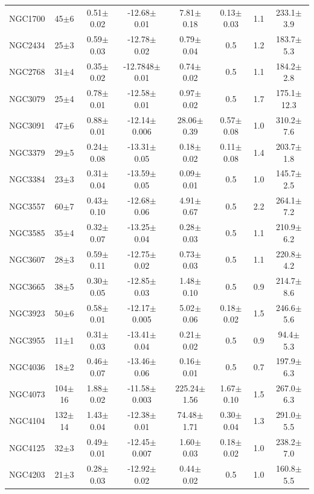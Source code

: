 \documentclass[iop]{emulateapj}
\begin{document}
\begin{table}
\begin{tabular}{lccccccc}
NGC1700 & 45$\pm$6 & 0.51$\pm$0.02 & -12.68$\pm$0.01  & 7.81$\pm$0.18  & 0.13$\pm$0.03 & 1.1  & 233.1$\pm$3.9\\
NGC2434 & 25$\pm$3 & 0.59$\pm$0.03 & -12.78$\pm$0.02  & 0.79$\pm$0.04 & 0.5 & 1.2  & 183.7$\pm$5.3\\
NGC2768 & 31$\pm$4 & 0.35$\pm$0.02 & -12.7848$\pm$0.01 & 0.74$\pm$0.02 & 0.5 & 1.1  & 184.2$\pm$2.8 \\
NGC3079 & 25$\pm$4 & 0.78$\pm$0.01 & -12.58$\pm$0.01 & 0.97$\pm$0.02 & 0.5 & 1.7  & 175.1$\pm$12.3 \\
NGC3091 & 47$\pm$6 & 0.88$\pm$0.01 & -12.14$\pm$0.006 & 28.06$\pm$0.39 & 0.57$\pm$0.08 & 1.0  & 310.2$\pm$7.6\\
NGC3379 & 29$\pm$5 & 0.24$\pm$0.08 & -13.31$\pm$0.05 & 0.18$\pm$0.02 & 0.11$\pm$0.08 & 1.4  & 203.7$\pm$1.8\\
NGC3384 & 23$\pm$3 & 0.31$\pm$0.04 & -13.59$\pm$0.05 & 0.09$\pm$0.01 & 0.5 & 1.0  & 145.7$\pm$2.5 \\
NGC3557 & 60$\pm$7 & 0.43$\pm$0.10  & -12.68$\pm$0.06  & 4.91$\pm$0.67  & 0.5 & 2.2  & 264.1$\pm$7.2\\
NGC3585 & 35$\pm$4 & 0.32$\pm$0.07 & -13.25$\pm$0.04  & 0.28$\pm$0.03  & 0.5 & 1.1  & 210.9$\pm$6.2\\
NGC3607 & 28$\pm$3 & 0.59$\pm$0.11  & -12.75$\pm$0.02  & 0.73$\pm$0.03  & 0.5 & 1.1  & 220.8$\pm$4.2\\
NGC3665 & 38$\pm$5 & 0.30$\pm$0.05  & -12.85$\pm$0.03  & 1.48$\pm$0.10  & 0.5 & 0.9  & 214.7$\pm$8.6\\
NGC3923 & 50$\pm$6 & 0.58$\pm$0.01  & -12.17$\pm$0.005  & 5.02$\pm$0.06  & 0.18$\pm$0.02 & 1.5  & 246.6$\pm$5.6\\
NGC3955 & 11$\pm$1 & 0.31$\pm$0.03  & -13.41$\pm$0.04  & 0.21$\pm$0.02  & 0.5 & 0.9  & 94.4$\pm$5.3 \\
NGC4036 & 18$\pm$2 & 0.46$\pm$0.07 & -13.46$\pm$0.06 & 0.16$\pm$0.01 & 0.5 & 0.7  & 197.9$\pm$6.3 \\
NGC4073 & 104$\pm$16 & 1.88$\pm$0.02 & -11.58$\pm$0.003 & 225.24$\pm$1.56 & 1.67$\pm$0.10 &  1.5  & 267.0$\pm$6.3\\
NGC4104 & 132$\pm$14 & 1.43$\pm$0.04 &  -12.38$\pm$0.01 & 74.48$\pm$1.71 & 0.30$\pm$0.04 &  1.3  & 291.0$\pm$5.5\\
NGC4125 & 32$\pm$3 & 0.49$\pm$0.01  & -12.45$\pm$0.007   & 1.60$\pm$0.03 & 0.18$\pm$0.02 & 1.0  & 238.2$\pm$7.0\\
NGC4203 & 21$\pm$3 & 0.28$\pm$0.03 & -12.92$\pm$0.02 & 0.44$\pm$0.02 & 0.5 & 1.0  & 160.8$\pm$5.5 \\

\end{tabular}
\end{table}
\end{document}
